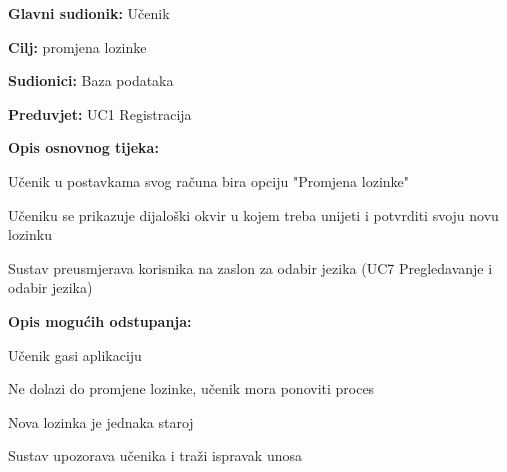 \noindent {}
\begin{packed_item}

	\item \textbf{Glavni sudionik:} Učenik
	\item  \textbf{Cilj:} promjena lozinke
	\item  \textbf{Sudionici:} Baza podataka
	\item  \textbf{Preduvjet:} UC1 Registracija 
	\item  \textbf{Opis osnovnog tijeka:}
	
	\item[] \begin{packed_enum}

		\item Učenik u postavkama svog računa bira opciju "Promjena lozinke"
		\item Učeniku se prikazuje dijaloški okvir u kojem treba unijeti i potvrditi svoju novu lozinku
		\item Sustav preusmjerava korisnika na zaslon za odabir jezika (UC7 Pregledavanje i odabir jezika)
	\end{packed_enum}
	
	\item  \textbf{Opis mogućih odstupanja:}
	
	\item[] \begin{packed_item}

		\item[1.a]Učenik gasi aplikaciju
		\item[] \begin{packed_enum}
			
			\item Ne dolazi do promjene lozinke, učenik mora ponoviti proces					
		\end{packed_enum}

		\item[2.a] Nova lozinka je jednaka staroj
		\item[] \begin{packed_enum}
			
			\item Sustav upozorava učenika i traži ispravak unosa  								
		\end{packed_enum}
		
	\end{packed_item}
\end{packed_item}



